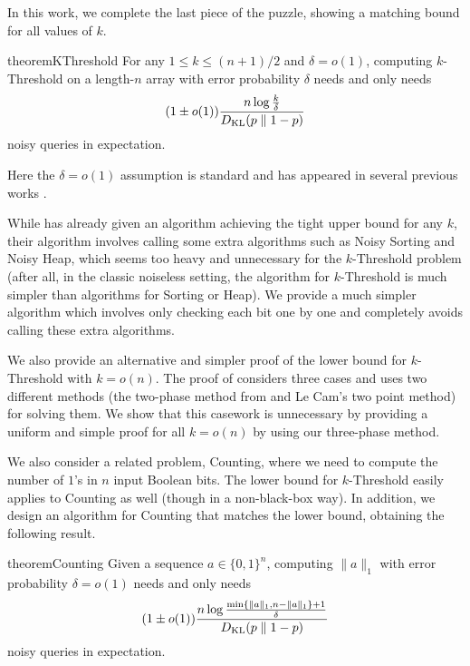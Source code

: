 In this work, we complete the last piece of the puzzle, showing a matching bound for all values of $k$.
\begin{restatable}{theorem}{KThreshold}
    \label{thm:k-threshold}
For any $1 \le k \le (n + 1) / 2$ and $\delta = o(1)$, computing $k$-Threshold on a length-$n$ array with error probability $\delta$ needs and only needs
\[
(1 \pm o(1)) \frac{n \log \frac{k}{\delta}}{D_{\operatorname{\mathrm{KL}}}(p \parallel 1-p)}
\]
noisy queries in expectation.
\end{restatable}
Here the $\delta=o(1)$ assumption is standard and has appeared in several previous works \cite{gu2023optimal,zhu2023noisy,wang2024noisy}.

While \cite{wang2024noisy} has already given an algorithm achieving the tight upper bound for any $k$, their algorithm involves calling some extra algorithms such as Noisy Sorting and Noisy Heap, which seems too heavy and unnecessary for the $k$-Threshold problem (after all, in the classic noiseless setting, the algorithm for $k$-Threshold is much simpler than algorithms for Sorting or Heap). We provide a much simpler algorithm which involves only checking each bit one by one and completely avoids calling these extra algorithms.

We also provide an alternative and simpler proof of the lower bound for $k$-Threshold with $k=o(n)$. The proof of \cite{wang2024noisy} considers three cases and uses two different methods (the two-phase method from \cite{feige1994computing} and Le Cam's two point method) for solving them. We show that this casework is unnecessary by providing a uniform and simple proof for all $k=o(n)$ by using our three-phase method.

We also consider a related problem, Counting, where we need to compute the number of $1$'s in $n$ input Boolean bits. The lower bound for $k$-Threshold easily applies to Counting as well (though in a non-black-box way). In addition, we design an algorithm for Counting that matches the lower bound, obtaining the following result.
\begin{restatable}{theorem}{Counting}
    \label{thm:counting}
    Given a sequence $a \in \{0, 1\}^n$, computing $\lVert a \rVert_1$ with error probability $\delta = o(1)$ needs and only needs
    \[
    (1\pm o(1))\frac{n \log \frac{\min\{\lVert a \rVert_1, n - \lVert a \rVert_1\}+1}{\delta}}{D_{\operatorname{\mathrm{KL}}}(p \parallel 1-p)}
    \]
    noisy queries in expectation.
\end{restatable}

